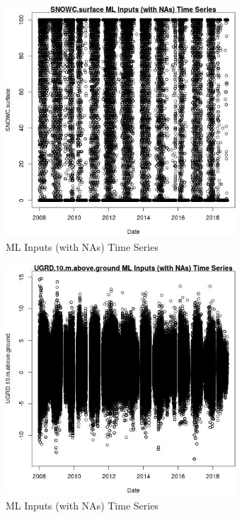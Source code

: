 \begin{figure} 
\centering  
\includegraphics[width=0.77\textwidth]{Code_Outputs/Report_ML_input_PM25_Step4_part_e_de_duplicated_aves_compiled_2019-05-20wNAs_SNOWCsurfacevDate.jpg} 
\caption{\label{fig:Report_ML_input_PM25_Step4_part_e_de_duplicated_aves_compiled_2019-05-20wNAsSNOWCsurfacevDate}ML Inputs (with NAs) Time Series} 
\end{figure} 
 

\clearpage 

\begin{figure} 
\centering  
\includegraphics[width=0.77\textwidth]{Code_Outputs/Report_ML_input_PM25_Step4_part_e_de_duplicated_aves_compiled_2019-05-20wNAs_UGRD10mabovegroundvDate.jpg} 
\caption{\label{fig:Report_ML_input_PM25_Step4_part_e_de_duplicated_aves_compiled_2019-05-20wNAsUGRD10mabovegroundvDate}ML Inputs (with NAs) Time Series} 
\end{figure} 
 

